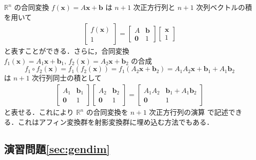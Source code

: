 \documentclass[11pt, uplatex, dvipdfmx, titlepage]{jsarticle}
\DeclareMathOperator{\Isom}{Isom}
\DeclareMathOperator{\Aff}{Aff}
\DeclareMathOperator{\PGL}{PGL}
\theoremstyle{definition}
\begin{document}
$\mathbb{R}^n$ の合同変換 $f(\bm{x}) = A\bm{x} + \bm{b}$ は $n+1$ 次正方行列と $n+1$ 次列ベクトルの積を用いて
\begin{align*}
  \left[
  \begin{array}{c}
    f(\bm{x})\\
    1
  \end{array}
  \right] = \left[
  \begin{array}{cc}
    A & \bm{b}\\
    \bm{0} & 1
  \end{array}
             \right] \left[
             \begin{array}{c}
               \bm{x}\\
               1
             \end{array}
  \right]
\end{align*}
と表すことができる．さらに，合同変換
$f_1(\bm{x})=A_1 \bm{x} + \bm{b}_1, \, f_2(\bm{x}) = A_2\bm{x} +
\bm{b}_2$ の合成
\[
  f_1\circ f_2(\bm{x}) =  f_1\left( f_2\left( \bm{x}\right) \right) 
  = f_1\left( A_2 \bm{x}+\bm{b}_2\right) = A_1 A_2 \bm{x} + \bm{b}_1+A_1\bm{b}_2
\]
は $n+1$ 次行列同士の積として
\begin{align*}
  \left[
  \begin{array}{cc}
    A_1 & \bm{b}_1\\
    \bm{0} & 1
  \end{array}
             \right] \left[
             \begin{array}{cc}
               A_2 & \bm{b}_2\\
               \bm{0} & 1
             \end{array}
                        \right] = \left[
                        \begin{array}{cc}
                          A_1 A_2 & \bm{b}_1+A_1\bm{b}_2\\
                          \bm{0} & 1
                        \end{array}
                                   \right]
\end{align*}
と表せる．これにより $\mathbb{R}^n$ の合同変換を $n+1$ 次正方行列の演算
で記述できる．これはアフィン変換群を射影変換群に埋め込む方法でもある．



\subsection*{演習問題\ref{sec:gendim}}
\end{document}
